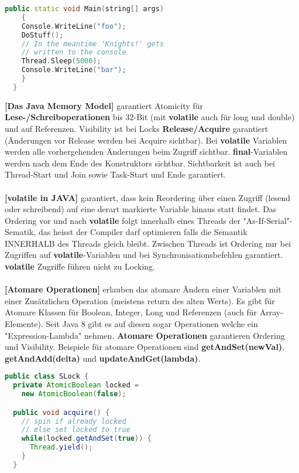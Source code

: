 \documentclass[8pt]{extarticle}
\let\oldtextbf\textbf
\renewcommand{\textbf}{\tiny\oldtextbf}
\begin{document}
\begin{multicols*}{5}
\begin{lstlisting}[language=c++]
  public static void Main(string[] args)
    {
    Console.WriteLine("foo");
    DoStuff();
    // In the meantime 'Knights!' gets
    // written to the console
    Thread.Sleep(5000);
    Console.WriteLine("bar");
    }
  }
\end{lstlisting}
\textbf{[Das Java Memory Model]} garantiert Atomicity für \textbf{Lese-/Schreiboperationen} bis 32-Bit (mit \textbf{volatile} auch für long und double) und auf Referenzen. Visibility ist bei Locks \textbf{Release/Acquire} garantiert (Änderungen vor Release werden bei Acquire sichtbar). Bei \textbf{volatile} Variablen werden alle vorhergehenden Änderungen beim Zugriff sichtbar. \textbf{final}-Variablen werden nach dem Ende des Konstruktors sichtbar. Sichtbarkeit ist auch bei Thread-Start und Join sowie Task-Start und Ende garantiert.\\\\
\textbf{[volatile in JAVA]} garantiert, dass kein Reordering über einen Zugriff (lesend oder schreibend) auf eine derart markierte Variable hinaus statt findet. Das Ordering vor und nach \textbf{volatile} folgt innerhalb eines Threads der "As-If-Serial"-Sematik, das heisst der Compiler darf optimieren falls die Semantik INNERHALB des Threads gleich bleibt. Zwischen Threads ist Ordering nur bei Zugriffen auf \textbf{volatile}-Variablen und bei Synchronisationsbefehlen garantiert. \textbf{volatile} Zugriffe führen nicht zu Locking.\\\\
\textbf{[Atomare Operationen]} erlauben das atomare Ändern einer Variablen mit einer Zusätzlichen Operation (meistens return des alten Werts). Es gibt für Atomare Klassen für Boolean, Integer, Long und Referenzen (auch für Array-Elemente). Seit Java 8 gibt es auf diesen sogar Operationen welche ein "Expression-Lambda" nehmen. \textbf{Atomare Operationen} garantieren Ordering und Visibility. Beispiele für atomare Operationen sind \textbf{getAndSet(newVal)}, \textbf{getAndAdd(delta)} und \textbf{updateAndGet(lambda)}.
\begin{lstlisting}[language=java]
public class SLock {
  private AtomicBoolean locked =
    new AtomicBoolean(false);

  public void acquire() {
    // spin if already locked
    // else set locked to true
    while(locked.getAndSet(true)) {
      Thread.yield();
    }
  }


\end{lstlisting}
\end{multicols*}
\end{document}
